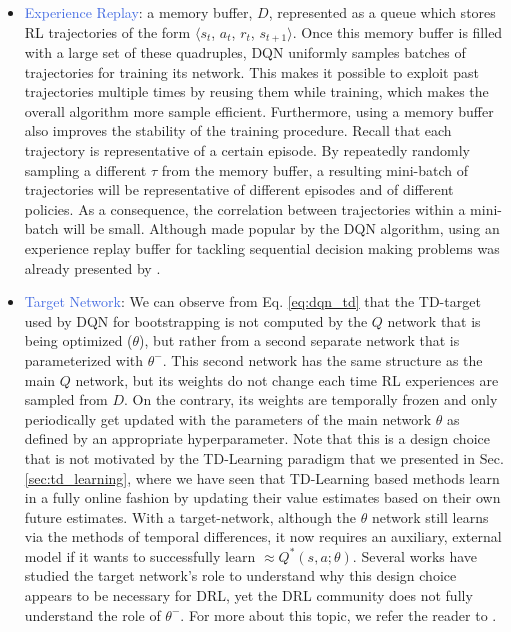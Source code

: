 \begin{itemize}
	\item \textcolor{RoyalBlue}{Experience Replay}: a memory buffer, $D$, represented as a queue which stores RL trajectories of the form $\langle s_{t}$, $a_{t}$, $r_{t}$, $s_{t+1} \rangle$. Once this memory buffer is filled with a large set of these quadruples, DQN uniformly samples batches of trajectories for training its network. This makes it possible to exploit past trajectories multiple times by reusing them while training, which makes the overall algorithm more sample efficient. Furthermore, using a memory buffer also improves the stability of the training procedure. Recall that each trajectory is representative of a certain episode. By repeatedly randomly sampling a different $\tau$ from the memory buffer, a resulting mini-batch of trajectories will be representative of different episodes and of different policies. As a consequence, the correlation between trajectories within a mini-batch will be small. Although made popular by the DQN algorithm, using an experience replay buffer for tackling sequential decision making problems was already presented by \citet{lin1992self}.
		
	\item \textcolor{RoyalBlue}{Target Network}: We can observe from Eq. \ref{eq:dqn_td} that the TD-target used by DQN for bootstrapping is not computed by the $Q$ network that is being optimized ($\theta$), but rather from a second separate network that is parameterized with $\theta^{-}$. This second network has the same structure as the main $Q$ network, but its weights do not change each time RL experiences are sampled from $D$. On the contrary, its weights are temporally frozen and only periodically get updated with the parameters of the main network $\theta$ as defined by an appropriate hyperparameter. Note that this is a design choice that is not motivated by the TD-Learning paradigm that we presented in Sec. \ref{sec:td_learning}, where we have seen that TD-Learning based methods learn in a fully online fashion by updating their value estimates based on their own future estimates. With a target-network, although the $\theta$ network still learns via the methods of temporal differences, it now requires an auxiliary, external model if it wants to successfully learn $\approx Q^{*}(s,a;\theta)$. Several works have studied the target network's role to understand why this design choice appears to be necessary for DRL, yet the DRL community does not fully understand the role of $\theta^{-}$. For more about this topic, we refer the reader to .

\end{itemize}

